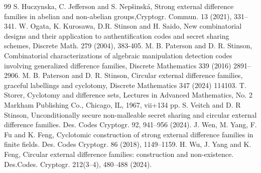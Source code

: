 \documentclass[12pt, a4paper]{article}
\theoremstyle{definition}
\begin{document}
\begin{thebibliography}{99}
 S. Huczynska, C. Jefferson and S. Nepšinská, Strong external difference families in abelian and non-abelian groups,Cryptogr. Commun. 13 (2021), 331–341.
  W. Ogata, K. Kurosawa, D.R. Stinson and H. Saido, New combinatorial designs and their application to authentification codes and secret sharing schemes, Discrete Math. 279 (2004), 383-405.
 M. B. Paterson and D. R. Stinson, Combinatorial characterizations of algebraic manipulation detection codes involving generalized difference families, Discrete Mathematics 339 (2016) 2891–2906.
  M. B. Paterson and D. R. Stinson, Circular external difference families, graceful labellings and cyclotomy, Discrete Mathematics 347 (2024) 114103.
  T. Storer, Cyclotomy and difference sets,
Lectures in Advanced Mathematics, No. 2
Markham Publishing Co., Chicago, IL, 1967, vii+134 pp.
 S. Veitch and D. R Stinson, Unconditionally secure non-malleable secret sharing and circular external difference families. Des. Codes Cryptogr. 92, 941–956 (2024).
  J. Wen, M. Yang, F. Fu and K. Feng, Cyclotomic construction of strong external difference families in finite fields. Des. Codes Cryptogr. 86 (2018), 1149–1159.
 H. Wu, J. Yang and K. Feng, Circular external difference families: construction and non-existence. Des.Codes. Cryptogr. 212(3–4), 480–488 (2024).
\end{thebibliography}
\end{document}
